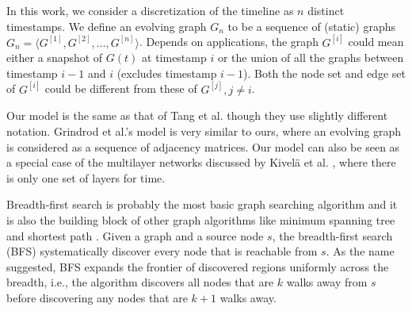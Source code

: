 \documentclass[11pt, conference, , compsocconf]{IEEEtran}
\theoremstyle{definition}
\begin{document}
In this work, we consider a discretization of the timeline as $n$ distinct 
timestamps. We define an evolving graph $G_n$ to be 
a sequence of (static) graphs 
$G_n = \langle G^{[1]}, G^{[2]}, \ldots, G^{[n]} \rangle$. 
Depends on applications, the graph $G^{[i]}$ could mean either
a snapshot of $G(t)$ at timestamp $i$ or  the union of all the graphs
between timestamp $i-1$ and $i$ (excludes timestamp $i-1$).
Both the node set and edge set of $G^{[i]}$ could be different from
these of $G^{[j]}, j \ne i$. 
\begin{center}
\end{center}
Our model is the same as that of Tang et al. \cite{tmml10} though they
use slightly different notation.
Grindrod et al.'s model  \cite{gphe11} \cite{grihig13} is very similar to ours, 
where an evolving graph is considered as a sequence of adjacency matrices.
Our model can also be seen as a special case of 
the multilayer networks discussed by Kivel{\"a} et al. \cite{kabg14}, where 
there is only one set of layers for time.

Breadth-first search is probably the most basic graph searching algorithm and 
it is also the building block of other graph algorithms like minimum spanning tree 
and shortest path \cite{ckrs09}.
Given a graph and a source node $s$, 
the breadth-first search (BFS) systematically discover every node that is reachable from $s$. 
As the name suggested, BFS expands the frontier of discovered regions
uniformly across the breadth, i.e., the algorithm discovers all nodes
that are $k$ walks away from $s$ before discovering any nodes that are
$k+1$ walks away. 
\end{document}
